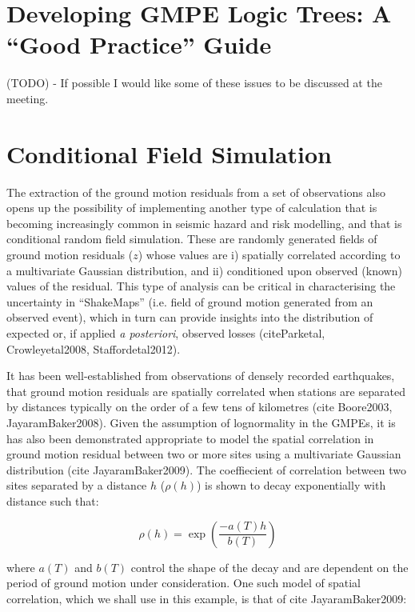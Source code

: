 \section{Developing GMPE Logic Trees: A ``Good Practice'' Guide}
\label{sec:logic_tree}

(TODO) - If possible I would like some of these issues to be discussed at the meeting.

\section{Conditional Field Simulation}
\label{sec:cond_field}

The extraction of the ground motion residuals from a set of observations also opens up the possibility of implementing another type of calculation that is becoming increasingly common in seismic hazard and risk modelling, and that is conditional random field simulation. These are randomly generated fields of ground motion residuals ($z$) whose values are i) spatially correlated according to a multivariate Gaussian distribution, and ii) conditioned upon observed (known) values of the residual. This type of analysis can be critical in characterising the uncertainty in ``ShakeMaps'' (i.e. field of ground motion generated from an observed event), which in turn can provide insights into the distribution of expected or, if applied \emph{a posteriori}, observed losses (citeParketal, Crowleyetal2008, Staffordetal2012).

It has been well-established from observations of densely recorded earthquakes, that ground motion residuals are spatially correlated when stations are separated by distances typically on the order of a few tens of kilometres (cite Boore2003, JayaramBaker2008). Given the assumption of lognormality in the GMPEs, it is has also been demonstrated appropriate to model the spatial correlation in ground motion residual between two or more sites using a multivariate Gaussian distribution (cite JayaramBaker2009). The coeffiecient of correlation between two sites separated by a distance $h$ ($\rho \left( h \right)$) is shown to decay exponentially with distance such that:

\begin{equation}
\rho \left( h \right) = \exp \left( {\frac{-a\left(T\right) h}{b \left(T\right)}} \right)
\end{equation}

\noindent where $a\left( T \right)$ and $b\left( T \right)$ control the shape of the decay and are dependent on the period of ground motion under consideration. One such model of spatial correlation, which we shall use in this example, is that of cite JayaramBaker2009:

